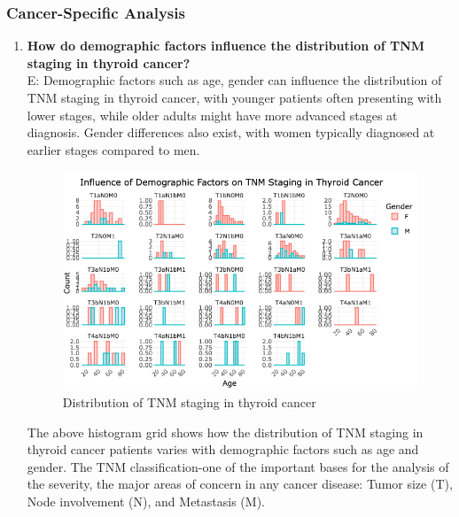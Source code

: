 \documentclass[12pt]{article}
\begin{document}
\newpage

\subsubsection{Cancer-Specific Analysis}

\begin{enumerate}
    \item \textbf{How do demographic factors influence the distribution of TNM staging in thyroid cancer?} \\
    E: Demographic factors such as age, gender can influence the distribution of TNM staging in thyroid cancer, with younger patients often presenting with lower stages, while older adults might have more advanced stages at diagnosis. Gender differences also exist, with women typically diagnosed at earlier stages compared to men.
    
    \begin{figure}[h]
        \centering
        \includegraphics[width=1.1\textwidth]{demographic TNM.png}  
        \caption{Distribution of TNM staging in thyroid cancer}
            \label{fig:example}
       \vspace{0.2cm}
    \end{figure}

The above histogram grid shows how the distribution of TNM staging in thyroid cancer patients varies with demographic factors such as age and gender. The TNM classification-one of the important bases for the analysis of the severity, the major areas of concern in any cancer disease: Tumor size (T), Node involvement (N), and Metastasis (M).


\end{enumerate}
\end{document}

